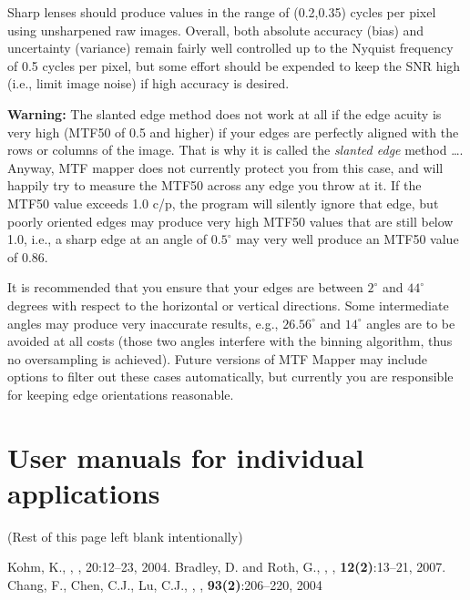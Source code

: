\documentclass[a4paper]{article}
\begin{document}
Sharp lenses should produce values in the range of (0.2,0.35) cycles per
pixel using unsharpened raw images.  Overall, both absolute accuracy (bias)
and uncertainty (variance) remain fairly well controlled up to the Nyquist
frequency of 0.5 cycles per pixel, but some effort should be expended to
keep the SNR high (i.e., limit image noise) if high accuracy is desired.

\textbf{Warning:} The slanted edge method does not work at all if the edge
acuity is very high (MTF50 of 0.5 and higher) if your edges
are perfectly aligned with the rows or columns of the image. That is why it
is called the \emph{slanted edge} method \ldots. Anyway, MTF mapper does not
currently protect you from this case, and will happily try to measure the
MTF50 across any edge you throw at it. If the MTF50 value exceeds 1.0 c/p,
the program will silently ignore that edge, but poorly oriented edges may
produce very high MTF50 values that are still below 1.0, i.e., a sharp edge at an
angle of $0.5^\circ$ may very well produce an MTF50 value of 0.86. 

It is
recommended that you ensure that your edges are between $2^\circ$ and
$44^\circ$ degrees with respect to the horizontal or vertical directions.
Some intermediate angles may produce very inaccurate results, e.g.,
$26.56^\circ$ and $14^\circ$ angles are to be avoided at all costs (those
two angles interfere with the binning algorithm, thus no oversampling is
achieved). Future versions of MTF Mapper may include options to filter out these cases
automatically, but currently you are responsible for keeping edge orientations
reasonable.

\section{User manuals for individual applications}
\label{sec:manpages}
\begin{center}
(Rest of this page left blank intentionally)
\end{center}





\begin{thebibliography}{9}
 Kohm, K., , , 20:12--23, 2004.
 Bradley, D. and Roth, G.,
,
, \textbf{12(2)}:13--21,
2007.
 Chang, F., Chen, C.J., Lu, C.J.,
,
, \textbf{93(2)}:206--220,
2004
\end{thebibliography}
\end{document}

